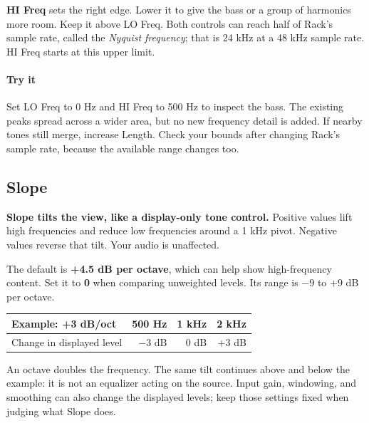 \textbf{HI Freq} sets the right edge. Lower it to give the bass or a group of
harmonics more room. Keep it above LO Freq. Both controls can reach half of
Rack's sample rate, called the \textit{Nyquist frequency}; that is 24 kHz
at a 48 kHz sample rate. HI Freq starts at this upper limit.

\paragraph{Try it}
Set LO Freq to 0 Hz and HI Freq to 500 Hz to inspect the bass. The existing
peaks spread across a wider area, but no new frequency detail is added.
If nearby tones still merge, increase Length. Check your bounds after
changing Rack's sample rate, because the available range changes too.

\subsection{Slope}

\textbf{Slope tilts the view, like a display-only tone control.} Positive
values lift high frequencies and reduce low frequencies around a 1 kHz
pivot. Negative values reverse that tilt. Your audio is unaffected.

The default is \textbf{+4.5 dB per octave}, which can help show high-frequency
content. Set it to \textbf{0} when comparing unweighted levels. Its range is
$-9$ to $+9$ dB per octave.

\begin{center}
\renewcommand{\arraystretch}{1.3}
\begin{tabular}{@{}lrrr@{}}
\toprule
\textbf{Example: +3 dB/oct} & \textbf{500 Hz} & \textbf{1 kHz} & \textbf{2 kHz} \\
\midrule
Change in displayed level & $-3$ dB & 0 dB & $+3$ dB \\
\bottomrule
\end{tabular}
\end{center}

An octave doubles the frequency. The same tilt continues above and below
the example: it is not an equalizer acting on the source. Input gain,
windowing, and smoothing can also change the displayed levels; keep those
settings fixed when judging what Slope does.

\endgroup
